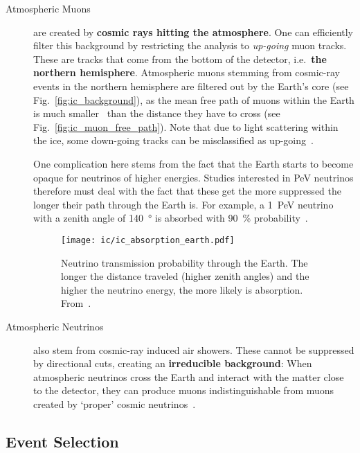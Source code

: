 \begin{description}
    \item[Atmospheric Muons] are created by \textbf{cosmic rays hitting the atmosphere}. One can efficiently filter this background by restricting the analysis to \textit{up-going} muon tracks. These are tracks that come from the bottom of the detector, i.e.\ \textbf{the northern hemisphere}. Atmospheric muons stemming from cosmic-ray events in the northern hemisphere are filtered out by the Earth's core (see Fig.~\ref{fig:ic_background}), as the mean free path of muons within the Earth is much smaller~ than the distance they have to cross (see Fig.~\ref{fig:ic_muon_free_path}). Note that due to light scattering within the ice, some down-going tracks can be misclassified as up-going~.

        One complication here stems from the fact that the Earth starts to become opaque for neutrinos of higher energies. Studies interested in \si{\peta\eV} neutrinos therefore must deal with the fact that these get the more suppressed the longer their path through the Earth is. For example, a \SI{1}{\peta\eV} neutrino with a zenith angle of \SI{140}{\degree} is absorbed with \SI{90}{\percent} probability~.

        \begin{figure}[htb]
            \texttt{[image: ic/ic\_absorption\_earth.pdf]}
            \caption[Neutrino absorption in the Earth]{Neutrino transmission probability through the Earth. The longer the distance traveled (higher zenith angles) and the higher the neutrino energy, the more likely is absorption. From~\cite{Aartsen2017c}.}
        \end{figure}

    \item[Atmospheric Neutrinos] also stem from cosmic-ray induced air showers. These cannot be suppressed by directional cuts, creating an \textbf{irreducible background}: When atmospheric neutrinos cross the Earth and interact with the matter close to the detector, they can produce muons indistinguishable from muons created by `proper' cosmic neutrinos~\cite{Ahlers2018a}.

\end{description}

\subsection{Event Selection}\label{ic_event_selection}

